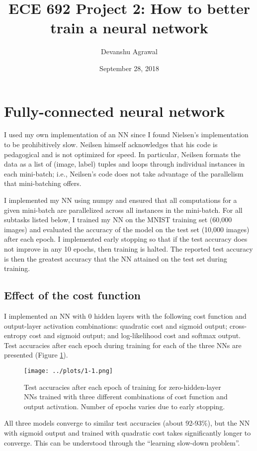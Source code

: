 \documentclass[11pt]{article}
\title{ECE 692 Project 2: How to better train a neural network}
\author{Devanshu Agrawal}
\date{September 28, 2018}
\begin{document}
\maketitle

\section{Fully-connected neural network}

I used my own implementation of an NN since I found Nielsen's implementation to be prohibitively slow. Neilsen himself acknowledges that his code is pedagogical and is not optimized for speed. In particular, Neilsen formats the data as a list of (image, label) tuples and loops through individual instances in each mini-batch; i.e., Neilsen's code does not take advantage of the parallelism that mini-batching offers.

I implemented my NN using numpy and ensured that all computations for a given mini-batch are parallelized across all instances in the mini-batch. For all subtasks listed below, I trained my NN on the MNIST training set (60,000 images) and evaluated the accuracy of the model on the test set (10,000 images) after each epoch. I implemented early stopping so that if the test accuracy does not improve in any 10 epochs, then training is halted. The reported test accuracy is then the greatest accuracy that the NN attained on the test set during training.

\subsection{Effect of the cost function}

I implemented an NN with 0 hidden layers with the following cost function and output-layer activation combinations: quadratic cost and sigmoid output; cross-entropy cost and sigmoid output; and log-likelihood cost and softmax output. Test accuracies after each epoch during training for each of the three NNs are presented (Figure \ref{fig-1-1}).

\begin{figure}
\centering
\texttt{[image: ../plots/1-1.png]}
\caption{\label{fig-1-1} Test accuracies after each epoch of training for zero-hidden-layer NNs trained with three different combinations of cost function and output activation. Number of epochs varies due to early stopping.}
\end{figure}

All three models converge to similar test accuracies (about 92-93\%), but the NN with sigmoid output and trained with quadratic cost takes significantly longer to converge. This can be understood through the ``learning slow-down problem''.
\end{document}
